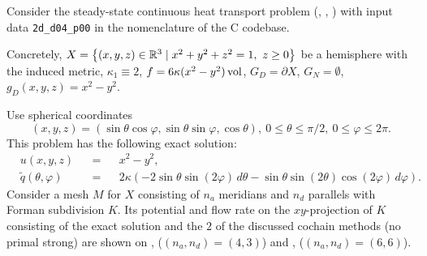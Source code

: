 \begin{example}
  \label{cmc/diffusion/continuous/steady_state/examples/2d_d04_p00-example}
  Consider the steady-state continuous heat transport problem
  (,
   ,
   )
  with input data \verb|2d_d04_p00| in the nomenclature of the C codebase.

  Concretely,
    $X = \left\{ (x, y, z) \in \mathbb{R}^3 \mid x^2 + y^2 + z^2 = 1,\ z \geq 0 \right\}$ be a
      hemisphere with the induced metric,
    $\kappa_1 \equiv 2$,
    $f = 6 \kappa (x^2 - y^2) \mathop{\rm vol}\nolimits$,
    $G_D = \partial X$,
    $G_N = \emptyset$,
    $g_D(x, y, z) = x^2 - y^2$.

  Use spherical coordinates
  \begin{equation}
    (x, y, z)
    = (\sin \theta \cos \varphi, \sin \theta \sin \varphi, \cos \theta),\
    0 \leq \theta \leq \pi / 2,\
    0 \leq \varphi \leq 2 \pi.
  \end{equation}
  This problem has the following exact solution:
  \begin{subequations}
    \begin{alignat}{3}
      & u(x, y, z) && = && x^2 - y^2, \\
      & \tilde{q}(\theta, \varphi) &&
      = && 2 \kappa (- 2 \sin \theta \sin(2 \varphi)\, d \theta
                     - \sin \theta \sin(2 \theta) \cos (2 \varphi)\, d \varphi).
    \end{alignat}
  \end{subequations}
  Consider a mesh $M$ for $X$ consisting of $n_a$ meridians and $n_d$ parallels
  with Forman subdivision $K$.
  Its potential and flow rate on the $xy$-projection of $K$ consisting of the
  exact solution and the $2$ of the discussed cochain methods (no primal strong)
  are shown on
  ,
  ($(n_a, n_d) = (4, 3)$)
  and
  ,
  ($(n_a, n_d) = (6, 6)$).
\end{example}
